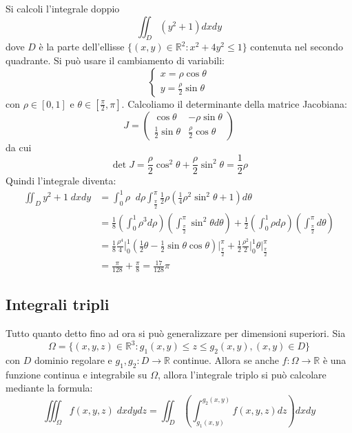 \documentclass[a4paper]{article}
\numberwithin{equation}{subsection}
\begin{document}
\ex{}
{
    Si calcoli l'integrale doppio 
    \[\iint_D (y^2 +1) dxdy \]
    dove $D$ è la parte dell'ellisse $\{(x,y)\in \mathbb{R}^2 : x^2 + 4y^2 \le 1\}$ contenuta nel secondo quadrante. 
    Si può usare il cambiamento di variabili:
    \[
    \begin{cases}
        x = \rho \cos{\theta}\\
        y = \frac{\rho}{2} \sin{\theta}
    \end{cases}
    \]
    con $\rho \in [0,1]$ e $\theta \in \left[\frac{\pi}{2}, \pi\right]$.
    Calcoliamo il determinante della matrice Jacobiana:
    \[J = \begin{pmatrix}
       \cos{\theta} & -\rho \sin{\theta}\\
         \frac{1}{2} \sin{\theta} & \frac{\rho}{2} \cos{\theta}
    \end{pmatrix}\]
    da cui
    \[\det{J} = \frac{\rho}{2}\cos^2{\theta} + \frac{\rho}{2}\sin^2{\theta} = \frac{1}{2}\rho\]
    Quindi l'integrale diventa:
    \[\begin{aligned}    
        \iint_D y^2 +  1 \; dxdy &= \int_0^1 \rho \; \; d\rho \int_{\frac{\pi}{2}}^{\pi} \frac{1}{2}\rho \left(\frac{1}{4}\rho^2 \sin^2{\theta} + 1\right) d\theta\\
        &= \frac{1}{8}\left(\int_0^1 \rho^3 d\rho\right) \left(\int_{\frac{\pi}{2}}^{\pi} \sin^2{\theta}d\theta\right) + \frac{1}{2}\left(\int_0^1 \rho d\rho\right) \left(\int_{\frac{\pi}{2}}^{\pi} d\theta\right)\\
        &= \frac{1}{8}\frac{\rho^4}{4}\Bigg|_0^1 \left(\frac{1}{2}\theta - \frac{1}{2}\sin{\theta}\cos{\theta} \right)\Bigg|_{\frac{\pi}{2}}^{\pi} + \frac{1}{2}\frac{\rho^2}{2}\Bigg|_0^1 \theta\Bigg|^{\pi}_{\frac{\pi}{2}}\\
        &= \frac{\pi}{128} + \frac{\pi}{8} = \frac{17}{128}\pi
    \end{aligned}
    \]
}

\subsection{Integrali tripli}

Tutto quanto detto fino ad ora si può generalizzare per dimensioni superiori.
Sia
\[\Omega = \{(x,y,z) \in \mathbb{R}^3 : g_1(x,y) \le z \le g_2(x,y),  (x,y) \in D\}\]
con $D$ dominio regolare e $g_1, g_2: D \rightarrow \mathbb{R}$ continue. Allora se anche $f : \Omega \rightarrow \mathbb{R}$
è una funzione continua e integrabile su $\Omega$, allora l'integrale triplo si può calcolare mediante la formula:
\[\iiint_\Omega f(x,y,z) \; dxdydz = \iint_D \left(\int_{g_1(x,y)}^{g_2(x,y)} f(x,y,z) dz\right)dxdy\]
\end{document}
